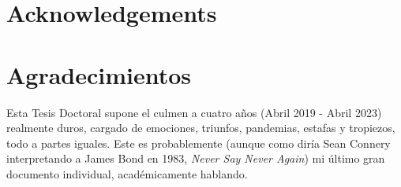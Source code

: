 %
%
%
% 
%
%
%
%

\thispagestyle{empty}

{
  \chapter*{Acknowledgements}
  \label{cha:acknowledgements}
}
{
  \chapter*{Agradecimientos}
  \label{cha:agradecimientos}
}


Esta Tesis Doctoral supone el culmen a cuatro años (Abril 2019 - Abril 2023) realmente duros, cargado de emociones, triunfos, pandemias, estafas y tropiezos, todo a partes iguales. Este es probablemente (aunque como diría Sean Connery interpretando a James Bond en 1983, \textit{Never Say Never Again}) mi último gran documento individual, académicamente hablando.


